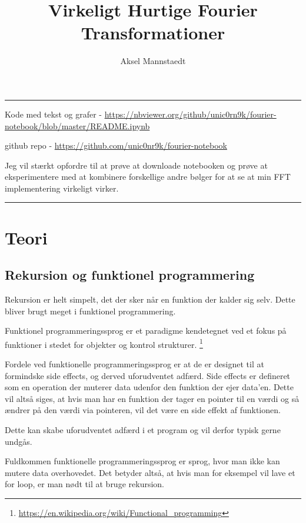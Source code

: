 \documentclass[11pt,a4paper]{article}
\author{Aksel Mannstaedt}
\date{}
\title{Virkeligt Hurtige Fourier Transformationer}
\begin{document}
\maketitle
\noindent\rule{\textwidth}{0.5pt}
Kode med tekst og grafer - \url{https://nbviewer.org/github/unic0rn9k/fourier-notebook/blob/master/README.ipynb}

github repo - \url{https://github.com/unic0nr9k/fourier-notebook}

\bigskip

Jeg vil stærkt opfordre til at prøve at downloade notebooken og prøve at eksperimentere med at kombinere forskellige andre bølger for at se at min FFT implementering virkeligt virker.

\noindent\rule{\textwidth}{0.5pt}

\setcounter{tocdepth}{2}
\tableofcontents

\newpage

\section{Teori}
\label{sec:orgf21774c}
\subsection{Rekursion og funktionel programmering}
\label{sec:org3716133}

Rekursion er helt simpelt, det der sker når en funktion der kalder sig selv.
Dette bliver brugt meget i funktionel programmering.

Funktionel programmeringssprog er et paradigme kendetegnet ved
et fokus på funktioner i stedet for objekter og kontrol strukturer. \footnote{\url{https://en.wikipedia.org/wiki/Functional\_programming}}

\bigskip

Fordele ved funktionelle programmeringssprog er at de er designet til at formindske side effects,
og derved uforudventet adfærd.
Side effects er defineret som en operation der muterer data udenfor den funktion der ejer data'en.
Dette vil altså siges, at hvis man har en funktion der tager en pointer til en værdi og så ændrer på
den værdi via pointeren, vil det være en side effekt af funktionen.

Dette kan skabe uforudventet adfærd i et program og vil derfor typisk gerne undgås.

Fuldkommen funktionelle programmeringssprog er sprog, hvor man ikke kan mutere data overhovedet.
Det betyder altså, at hvis man for eksempel vil lave et for loop, er man nødt til at bruge rekursion.
\end{document}
